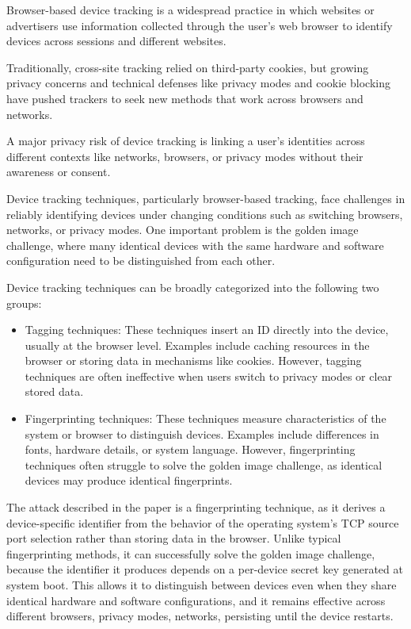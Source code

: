 \documentclass{report}
\begin{document}
\alert{Browser-based device tracking} is a widespread practice in which websites or advertisers use information collected through the user’s web browser to identify devices across sessions and different websites.

Traditionally, cross-site tracking relied on \alert{third-party cookies}, but growing privacy concerns and technical defenses like privacy modes and cookie blocking have pushed trackers to seek new methods that work across browsers and networks.

A major \alert{privacy risk} of device tracking is linking a user’s identities across different contexts like networks, browsers, or privacy modes without their awareness or consent.


Device tracking techniques, particularly browser-based tracking, face challenges in reliably identifying devices under changing conditions such as switching browsers, networks, or privacy modes. One important problem is the \alert{golden image challenge}, where many identical devices with the same hardware and software configuration need to be distinguished from each other.

Device tracking techniques can be broadly categorized into the following two groups:

\begin{itemize}
	\item \alert{Tagging techniques:} These techniques insert an ID directly into the device, usually at the browser level. Examples include caching resources in the browser or storing data in mechanisms like cookies. However, tagging techniques are often ineffective when users switch to privacy modes or clear stored data.

	\item \alert{Fingerprinting techniques:} These techniques measure characteristics of the system or browser to distinguish devices. Examples include differences in fonts, hardware details, or system language. However, fingerprinting techniques often struggle to solve the golden image challenge, as identical devices may produce identical fingerprints.
\end{itemize}

The attack described in the paper is a \alert{fingerprinting technique}, as it derives a device-specific identifier from the behavior of the operating system’s TCP source port selection rather than storing data in the browser. Unlike typical fingerprinting methods, it can successfully solve the \alert{golden image challenge}, because the identifier it produces depends on a per-device secret key generated at system boot. This allows it to distinguish between devices even when they share identical hardware and software configurations, and it remains effective across different browsers, privacy modes, networks, persisting until the device restarts.
\end{document}
